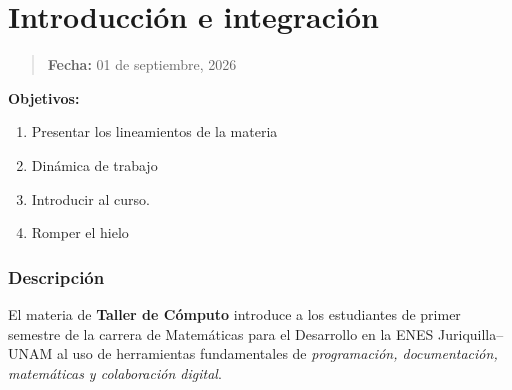 \documentclass[
  spanish,
  12pt,
  letterpaper,
  DIV=11,
  numbers=noendperiod]{scrreprt}
\providecommand{\tightlist}{%
  \setlength{\itemsep}{0pt}\setlength{\parskip}{0pt}}
\begin{document}

\chapter{Introducción e
integración}\label{introducciuxf3n-e-integraciuxf3n}

\begin{quote}
\textbf{Fecha:} 01 de septiembre, 2026
\end{quote}

\textbf{Objetivos:}

\begin{enumerate}
\def\labelenumi{\arabic{enumi}.}
\tightlist
\item
  Presentar los lineamientos de la materia
\item
  Dinámica de trabajo
\item
  Introducir al curso.
\item
  Romper el hielo
\end{enumerate}

\subsection{Descripción}\label{descripciuxf3n}

El materia de \textbf{Taller de Cómputo} introduce a los estudiantes de
primer semestre de la carrera de Matemáticas para el Desarrollo en la
ENES Juriquilla--UNAM al uso de herramientas fundamentales de
\emph{programación, documentación, matemáticas y colaboración digital}.
\end{document}
